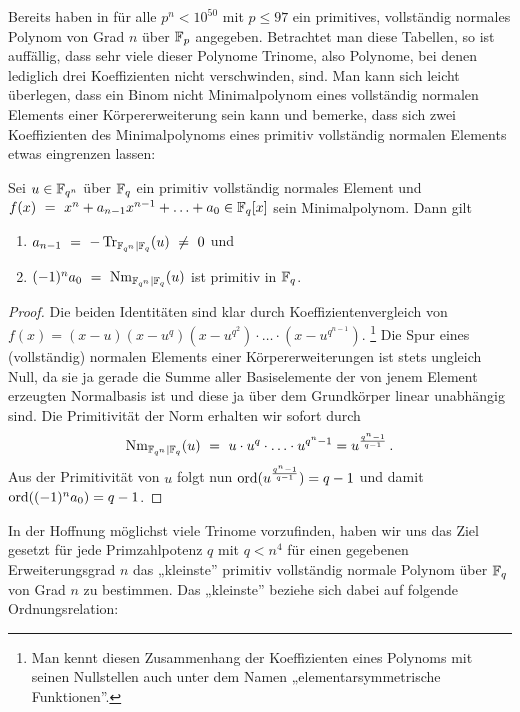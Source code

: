 Bereits \citeauthor{morgan1996} haben in \autocite{morgan1996} für alle 
$p^n < 10^{50}$ mit $p\leq 97$ ein primitives, vollständig normales Polynom 
von Grad $n$ über $\mathbb{F}_p$ angegeben. Betrachtet man diese Tabellen, so ist
auffällig, dass sehr viele dieser Polynome Trinome, also Polynome, bei denen
lediglich drei Koeffizienten nicht verschwinden, sind. Man kann sich leicht
überlegen, dass ein Binom nicht Minimalpolynom eines vollständig normalen
Elements einer Körpererweiterung sein kann und bemerke, dass sich 
zwei Koeffizienten des Minimalpolynoms eines primitiv vollständig normalen
Elements etwas eingrenzen lassen:

\begin{lemma}
  \label{lemma:pcn_koeff}
  Sei $u \in \mathbb{F}_{q^n}$ über $\mathbb{F}_q$ ein primitiv vollständig normales Element
  und $f(x) \ =\  x^n + a_{n-1}x^{n-1}+\ldots+a_0 \in \mathbb{F}_q[x]$ 
  sein Minimalpolynom. Dann gilt
  \begin{enumerate}
    \item $a_{n-1} \ =\  -\operatorname{Tr}_{\mathbb{F}_{q^n}\mid \mathbb{F}_q}(u) \ \neq\  0$ und 
    \item $(-1)^na_0 \ =\  \operatorname{Nm}_{\mathbb{F}_{q^n}\mid \mathbb{F}_q}(u)$ ist primitiv in $\mathbb{F}_q$.
  \end{enumerate}
\end{lemma}
\begin{proof}
  Die beiden Identitäten sind klar durch Koeffizientenvergleich von
  $f(x) = (x-u)(x-u^q)(x-u^{q^2})\cdot\ldots\cdot(x-u^{q^{n-1}})$.%
  \footnote{Man kennt diesen Zusammenhang der 
    Koeffizienten eines Polynoms mit seinen Nullstellen auch unter dem Namen
    „elementarsymmetrische Funktionen”.}
  Die Spur eines (vollständig) normalen Elements einer Körpererweiterungen ist
  stets ungleich Null, da sie ja gerade die Summe aller Basiselemente der 
  von jenem Element erzeugten Normalbasis ist und diese ja über dem Grundkörper
  linear unabhängig sind. 
  Die Primitivität der Norm erhalten wir sofort durch
  \[ \operatorname{Nm}_{\mathbb{F}_{q^n}\mid \mathbb{F}_q}(u) \ =\  u\cdot u^q\cdot \ldots\cdot u^{q^n-1}
    = u^{\frac{q^n-1}{q-1}}\,.\]
  Aus der Primitivität von $u$ folgt nun $\operatorname{ord}(u^{\frac{q^n-1}{q-1}}) = q-1$
  und damit $\operatorname{ord}((-1)^na_0) = q-1$.
\end{proof}

In der Hoffnung möglichst viele Trinome vorzufinden, haben wir uns das Ziel
gesetzt für jede Primzahlpotenz $q$ mit $q < n^4$ für einen gegebenen
Erweiterungsgrad $n$ das „kleinste” primitiv vollständig normale Polynom
über $\mathbb{F}_q$ von Grad $n$ zu bestimmen. Das „kleinste” beziehe sich dabei auf
folgende Ordnungsrelation:

